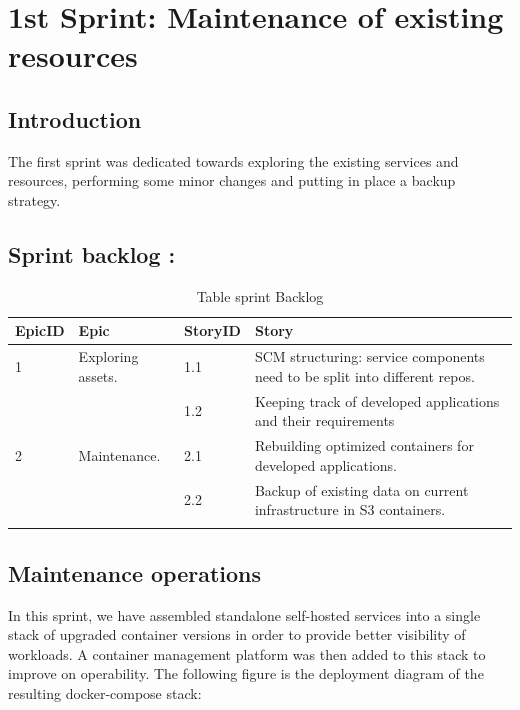\graphicspath{{./assets/}}
\setcounter{mtc}{3}
\chapter{ 1st Sprint: Maintenance of existing resources  }
\minitoc
\newpage


\section*{Introduction}
The first sprint was dedicated towards exploring the existing services and resources, performing some minor changes and putting in place a backup strategy.

\section{Sprint backlog :}

\begin{longtable}[H]{|m{1.5cm}|m{3cm}|m{1.5cm}|m{8cm}|}
\hline
{\textbf{EpicID}} & {\textbf{Epic}} & {\textbf{StoryID}} & {\textbf{Story}} \\
\hline
1 &  \raggedright Exploring assets.	& 1.1  & SCM structuring: service components need to be split into different repos. \\
\cline{3-4}
& & 1.2 &  	Keeping track of developed applications and their requirements \\
\hline
2  & Maintenance. &	2.1	 &  Rebuilding optimized containers for developed applications. \\
\cline{3-4}
& & 2.2 & Backup of existing data on current infrastructure in S3 containers.\\
\hline
\caption{Table sprint Backlog}
\end{longtable}

\section{Maintenance operations}

In this sprint, we have assembled standalone self-hosted services into a single stack of upgraded container versions in order to provide better visibility of workloads. A container management platform was then added to this stack to improve on operability. 
The following figure is the deployment diagram of the resulting docker-compose stack:

